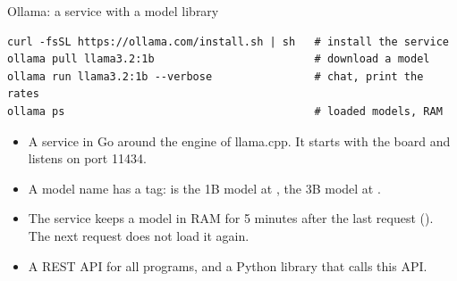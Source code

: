\begin{frame}[fragile]{Ollama: a service with a model library}
\begin{lstlisting}[style=shell]
curl -fsSL https://ollama.com/install.sh | sh   # install the service
ollama pull llama3.2:1b                         # download a model
ollama run llama3.2:1b --verbose                # chat, print the rates
ollama ps                                       # loaded models, RAM
\end{lstlisting}
  \small
  \begin{itemize}
    \item A service in Go around the engine of llama.cpp. It starts with
          the board and listens on port 11434.
    \item A model name has a tag:  is the 1B model at
          ,  the 3B model at
          .
    \item The service keeps a model in RAM for 5 minutes after the last
          request (). The next request does not load it
          again.
    \item A REST API for all programs, and a Python library that calls
          this API.
  \end{itemize}
\end{frame}

